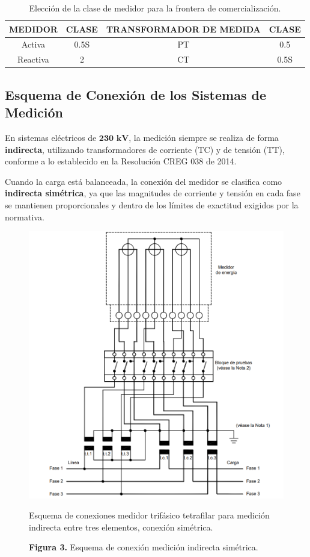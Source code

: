 \begin{table}[t]
  \centering
  \caption{Elección de la clase de medidor para la frontera de comercialización.}
  \label{tab:clase_medidor_comercializacion}
  \begin{tabular}{cccc}
    \toprule
    \textbf{MEDIDOR} & \textbf{CLASE} & \textbf{TRANSFORMADOR DE MEDIDA} & \textbf{CLASE} \\
    \midrule
    Activa & 0.5S & PT & 0.5 \\
    Reactiva & 2 & CT & 0.5S \\
    \bottomrule
  \end{tabular}
\end{table}

\subsection{Esquema de Conexión de los Sistemas de Medición} \label{subsec:esquema_conexion}
En sistemas eléctricos de $\mathbf{230 \text{ kV}}$, la medición siempre se realiza de forma \textbf{indirecta}, utilizando transformadores de corriente (TC) y de tensión (TT), conforme a lo establecido en la Resolución CREG 038 de 2014.

Cuando la carga está balanceada, la conexión del medidor se clasifica como \textbf{indirecta simétrica}, ya que las magnitudes de corriente y tensión en cada fase se mantienen proporcionales y dentro de los límites de exactitud exigidos por la normativa.

\begin{figure}[t]
    \centering
    \includegraphics[width=\columnwidth]{figs/figura_esquema_simetrico.png}
    \caption{Esquema de conexiones medidor trifásico tetrafilar para medición indirecta entre tres elementos, conexión simétrica.}
    \label{fig:esquema_simetrico}
    \caption*{\textbf{Figura 3.} Esquema de conexión medición indirecta simétrica.}
\end{figure}

